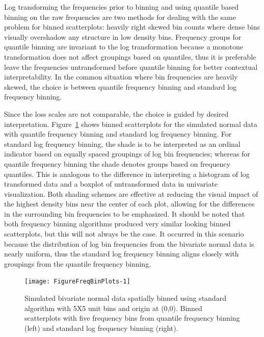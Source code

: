 \documentclass[11pt]{isuthesis}\usepackage[]{graphicx}\usepackage[]{color}
\newenvironment{knitrout}{}{} %
\begin{document}
Log transforming the frequencies prior to binning and using quantile based binning on the raw frequencies are two methods for dealing with the same problem for binned scatterplots: heavily right skewed bin counts where dense bins visually overshadow any structure in low density bins. Frequency groups for quantile binning are invariant to the log transformation because a monotone transformation does not affect groupings based on quantiles, thus it is preferable leave the frequencies untransformed before quantile binning for better contextual interpretability. In the common situation where bin frequencies are heavily skewed, the choice is between quantile frequency binning and standard log frequency binning.

Since the loss scales are not comparable, the choice is guided by desired interpretation. 
Figure~\ref{freqbinning} shows binned scatterplots for the simulated normal data with quantile frequency binning and standard log frequency binning. For standard log frequency binning, the shade is to be interpreted as an ordinal indicator based on equally spaced groupings of log bin frequencies; whereas for quantile frequency binning the shade denotes groups based on frequency quantiles. This is analogous to the difference in interpreting a histogram of log transformed data and a boxplot of untransformed data in univariate visualization. Both shading schemes are effective at reducing the visual impact of the highest density bins near the center of each plot, allowing for the differences in the surrounding bin frequencies to be emphasized. It should be noted that both frequency binning algorithms produced very similar looking binned scatterplots, but this will not always be the case. It occurred in this scenario because the distribution of log bin frequencies from the bivariate normal data is nearly uniform, thus the standard log frequency binning aligns closely with groupings from the quantile frequency binning.

\begin{figure}[hbtp]
\begin{knitrout}
\color{fgcolor}

{\centering \texttt{[image: FigureFreqBinPlots-1]} 

}



\end{knitrout}
\caption{\label{freqbinning}Simulated bivariate normal data spatially binned using standard algorithm with 5X5 unit bins and origin at (0,0). Binned scatterplots with five frequency bins from quantile frequency binning (left) and standard log frequency binning (right). }
\end{figure}
\end{document}
